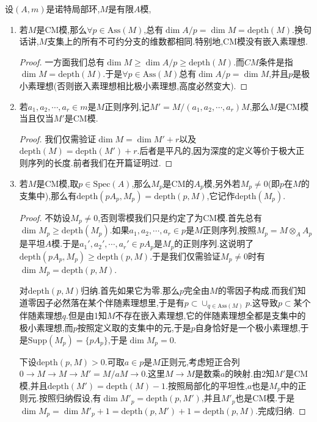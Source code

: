 设$(A,m)$是诺特局部环,$M$是有限$A$模,
\begin{enumerate}
	\item 若$M$是CM模,那么$\forall p\in\mathrm{Ass}(M)$,总有$\dim A/p=\dim M=\mathrm{depth}(M)$.换句话讲,$M$支集上的所有不可约分支的维数都相同.特别地,CM模没有嵌入素理想.
	\begin{proof}
		
		一方面我们总有$\dim M\ge\dim A/p\ge\mathrm{depth}(M)$.而$CM$条件是指$\dim M=\mathrm{depth}(M)$.于是$\forall p\in\mathrm{Ass}(M)$总有$\dim A/p=\dim M$,并且$p$是极小素理想(否则嵌入素理想相比极小素理想,高度必然变大).
	\end{proof}
	\item 若$a_1,a_2,\cdots,a_r\in m$是$M$正则序列,记$M'=M/(a_1,a_2,\cdots,a_r)M$,那么$M$是CM模当且仅当$M'$是CM模.
	\begin{proof}
		
		我们仅需验证$\dim M=\dim M'+r$以及$\mathrm{depth}(M)=\mathrm{depth}(M')+r$.后者是平凡的,因为深度的定义等价于极大正则序列的长度.前者我们在开篇证明过.
	\end{proof}
	\item 若$M$是CM模,取$p\in\mathrm{Spec}(A)$,那么$M_p$是CM的$A_p$模,另外若$M_p\not=0$(即$p$在$M$的支集中),那么有$\mathrm{depth}(pA_p,M_p)=\mathrm{depth}(p,M)$,它记作$\mathrm{depth}(M_p)$.
	\begin{proof}
		
		不妨设$M_p\not=0$,否则零模我们只是约定了为CM模.首先总有$\dim M_p\ge\mathrm{depth}(M_p)$.如果$a_1,a_2,\cdots,a_r\in p$是$M$正则序列,按照$M_p=M\otimes_AA_p$是平坦$A$模.于是$a_1',a_2',\cdots,a_r'\in pA_p$是$M_p$的正则序列.这说明了$\mathrm{depth}(pA_p,M_p)\ge\mathrm{depth}(p,M)$.于是我们仅需验证$M_p\not=0$时有$\dim M_p=\mathrm{depth}(p,M)$.
		
		对$\mathrm{depth}(p,M)$归纳.首先如果它为零.那么$p$完全由$M$的零因子构成.而我们知道零因子必然落在某个伴随素理想里,于是有$p\subset\cup_{q\in\mathrm{Ass}(M)}p$.这导致$p\subset$某个伴随素理想$q$.但是由1知$M$不存在嵌入素理想,它的伴随素理想全都是支集中的极小素理想,而$p$按照定义取的支集中的元,于是$p$自身恰好是一个极小素理想,于是$\mathrm{Supp}(M_p)=\{pA_p\}$,于是$\dim M_p=0$.
		
		下设$\mathrm{depth}(p,M)>0$.可取$a\in p$是$M$正则元,考虑短正合列$0\to M\to M\to M'=M/aM\to0$.这里$M\to M$是数乘$a$的映射.由2知$M'$是CM模,并且$\mathrm{depth}(M')=\mathrm{depth}(M)-1$.按照局部化的平坦性,$a$也是$M_p$中的正则元.按照归纳假设,有$\dim M'_p=\mathrm{depth}(p,M')$,并且$M'_p$也是CM模.于是$\dim M_p=\dim M'_p+1=\mathrm{depth}(p,M')+1=\mathrm{depth}(p,M)$.完成归纳.
	\end{proof}
\end{enumerate}

